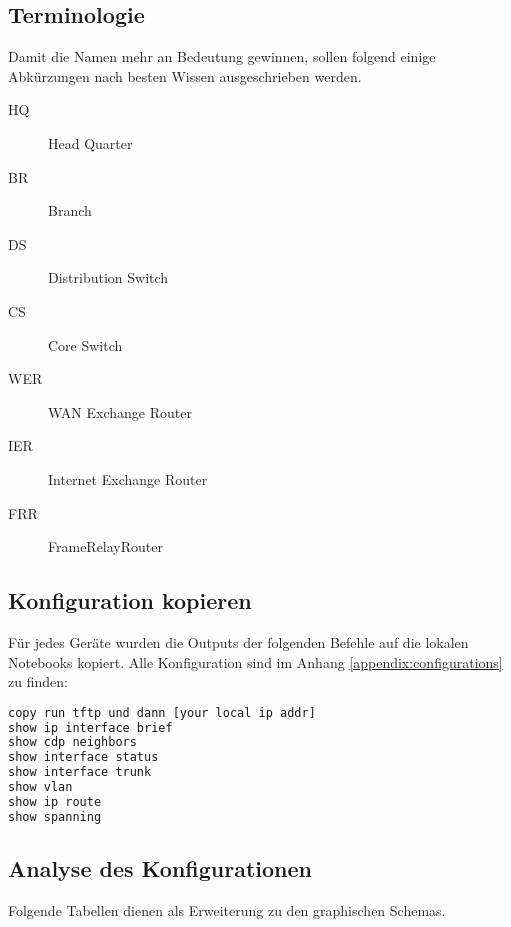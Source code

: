 \subsection{Terminologie}
Damit die Namen mehr an Bedeutung gewinnen, sollen folgend einige Abkürzungen nach besten Wissen ausgeschrieben werden.
\begin{multicols}{2}
\begin{description}
	\item[HQ] Head Quarter
	\item[BR] Branch
	\item[DS] Distribution Switch
	\item[CS] Core Switch
	\item[WER] WAN Exchange Router
	\item[IER] Internet Exchange Router
	\item[FRR] FrameRelayRouter
\end{description}
\end{multicols}


\subsection{Konfiguration kopieren}
Für jedes Geräte wurden die Outputs der folgenden Befehle auf die lokalen Notebooks kopiert. Alle Konfiguration sind im Anhang \ref{appendix:configurations} zu finden:
\begin{lstlisting}[language=bash]
copy run tftp und dann [your local ip addr]
show ip interface brief
show cdp neighbors
show interface status
show interface trunk
show vlan
show ip route
show spanning
\end{lstlisting}

\subsection{Analyse des Konfigurationen}
Folgende Tabellen dienen als Erweiterung zu den graphischen Schemas.
